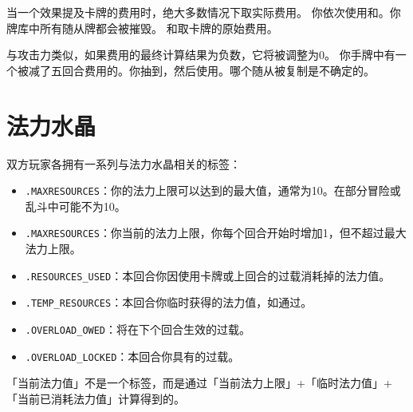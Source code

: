 当一个效果提及卡牌的费用时，绝大多数情况下取实际费用。
\example 你依次使用和。你牌库中所有随从牌都会被摧毁。
\exception {}和取卡牌的原始费用。

与攻击力类似，如果费用的最终计算结果为负数，它将被调整为0。
\example 你手牌中有一个被减了五回合费用的。你抽到，然后使用。哪个随从被复制是不确定的。

\section{法力水晶}
双方玩家各拥有一系列与法力水晶相关的标签：
\begin{itemize}
    \item {}\texttt{.MAXRESOURCES}：你的法力上限可以达到的最大值，通常为10。在部分冒险或乱斗中可能不为10。
    \item {}\texttt{.MAXRESOURCES}：你当前的法力上限，你每个回合开始时增加1，但不超过最大法力上限。
    \item {}\texttt{.RESOURCES\_USED}：本回合你因使用卡牌或上回合的过载消耗掉的法力值。
    \item {}\texttt{.TEMP\_RESOURCES}：本回合你临时获得的法力值，如通过。
    \item {}\texttt{.OVERLOAD\_OWED}：将在下个回合生效的过载。
    \item {}\texttt{.OVERLOAD\_LOCKED}：本回合你具有的过载。
\end{itemize}
\notice 「当前法力值」不是一个标签，而是通过「当前法力上限」+「临时法力值」+「当前已消耗法力值」计算得到的。

